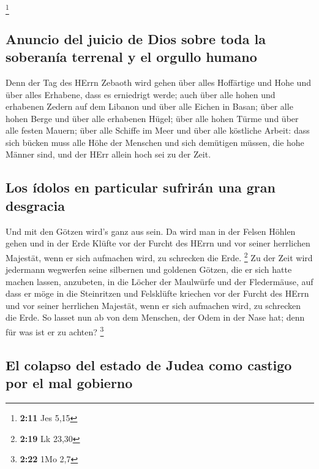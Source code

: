 \footnote{\textbf{2:11} Jes 5,15}

\hypertarget{anuncio-del-juicio-de-dios-sobre-toda-la-soberanuxeda-terrenal-y-el-orgullo-humano}{%
\subsection{Anuncio del juicio de Dios sobre toda la soberanía terrenal
y el orgullo
humano}\label{anuncio-del-juicio-de-dios-sobre-toda-la-soberanuxeda-terrenal-y-el-orgullo-humano}}

 Denn der Tag des HErrn Zebaoth wird gehen über alles
Hoffärtige und Hohe und über alles Erhabene, dass es erniedrigt werde;
 auch über alle hohen und erhabenen Zedern auf dem
Libanon und über alle Eichen in Basan;  über alle hohen
Berge und über alle erhabenen Hügel;  über alle hohen
Türme und über alle festen Mauern;  über alle Schiffe im
Meer und über alle köstliche Arbeit:  dass sich bücken
muss alle Höhe der Menschen und sich demütigen müssen, die hohe Männer
sind, und der HErr allein hoch sei zu der Zeit.

\hypertarget{los-uxeddolos-en-particular-sufriruxe1n-una-gran-desgracia}{%
\subsection{Los ídolos en particular sufrirán una gran
desgracia}\label{los-uxeddolos-en-particular-sufriruxe1n-una-gran-desgracia}}

 Und mit den Götzen wird's ganz aus sein. 
Da wird man in der Felsen Höhlen gehen und in der Erde Klüfte vor der
Furcht des HErrn und vor seiner herrlichen Majestät, wenn er sich
aufmachen wird, zu schrecken die Erde. \footnote{\textbf{2:19} Lk 23,30}
 Zu der Zeit wird jedermann wegwerfen seine silbernen und
goldenen Götzen, die er sich hatte machen lassen, anzubeten, in die
Löcher der Maulwürfe und der Fledermäuse,  auf dass er
möge in die Steinritzen und Felsklüfte kriechen vor der Furcht des HErrn
und vor seiner herrlichen Majestät, wenn er sich aufmachen wird, zu
schrecken die Erde.  So lasset nun ab von dem Menschen,
der Odem in der Nase hat; denn für was ist er zu achten? \footnote{\textbf{2:22}
  1Mo 2,7}

\hypertarget{el-colapso-del-estado-de-judea-como-castigo-por-el-mal-gobierno}{%
\subsection{El colapso del estado de Judea como castigo por el mal
gobierno}\label{el-colapso-del-estado-de-judea-como-castigo-por-el-mal-gobierno}}

